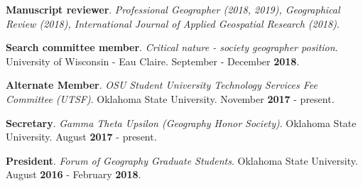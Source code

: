 \begin{cventries}
  \cventry
    {}
    {}
    {}
    {}
    {
       \begin{cvitems}
          \vspace{-3mm}
        \item {\textbf{Manuscript reviewer}. \textit{Professional Geographer
              (2018, 2019), Geographical Review (2018), International Journal of
            Applied Geospatial Research (2018)}. }
          \end{cvitems}
          }

  \cventry
    {}
    {}
    {}
    {}
    {
       \begin{cvitems}
          \vspace{-3mm}
        \item {\textbf{Search committee member}. \textit{Critical nature -
              society geographer position}. University of Wisconsin - Eau
            Claire. September - December \textbf{2018}.}
          \end{cvitems}
          }

  \cventry
    {}
    {}
    {}
    {}
    {
       \begin{cvitems}
          \vspace{-3mm}
        \item {\textbf{Alternate Member}. \textit{OSU Student University
              Technology Services Fee Committee (UTSF)}. Oklahoma State
            University. November \textbf{2017} - present.}
          \end{cvitems}
          }

  \cventry
    {}
    {}
    {}
    {}
    {
       \begin{cvitems}
          \vspace{-3mm}
        \item {\textbf{Secretary}. \textit{Gamma Theta Upsilon (Geography Honor
              Society)}. Oklahoma State University. August \textbf{2017} -
            present.}
          \end{cvitems}
          }

  \cventry
    {}
    {}
    {}
    {}
    {
       \begin{cvitems}
          \vspace{-3mm}
        \item {\textbf{President}. \textit{Forum of Geography Graduate
              Students}. Oklahoma State University. August \textbf{2016} -
            February \textbf{2018}.} 
          \end{cvitems}
          }


\end{cventries}
